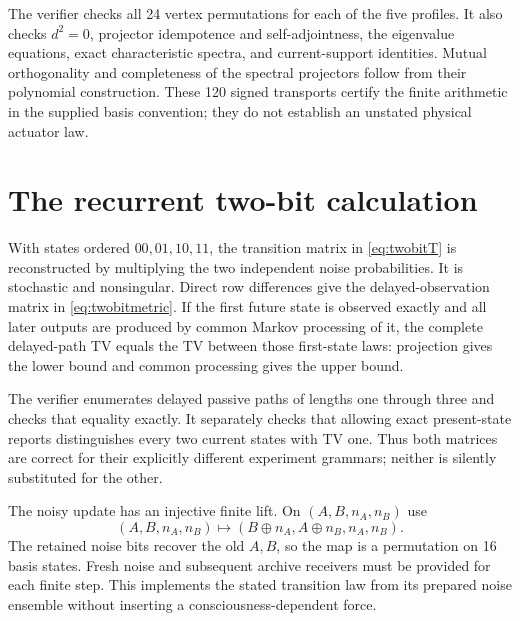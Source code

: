 The verifier checks all 24 vertex permutations for each of the five profiles. It also checks $d^2=0$, projector idempotence and self-adjointness, the eigenvalue equations, exact characteristic spectra, and current-support identities. Mutual orthogonality and completeness of the spectral projectors follow from their polynomial construction. These 120 signed transports certify the finite arithmetic in the supplied basis convention; they do not establish an unstated physical actuator law.

\section{The recurrent two-bit calculation}\label{section:matrices:the-recurrent-two-bit-calculation}
With states ordered $00,01,10,11$, the transition matrix in \cref{eq:twobitT} is reconstructed by multiplying the two independent noise probabilities. It is stochastic and nonsingular. Direct row differences give the delayed-observation matrix in \cref{eq:twobitmetric}. If the first future state is observed exactly and all later outputs are produced by common Markov processing of it, the complete delayed-path TV equals the TV between those first-state laws: projection gives the lower bound and common processing gives the upper bound.

The verifier enumerates delayed passive paths of lengths one through three and checks that equality exactly. It separately checks that allowing exact present-state reports distinguishes every two current states with TV one. Thus both matrices are correct for their explicitly different experiment grammars; neither is silently substituted for the other.

The noisy update has an injective finite lift. On $(A,B,n_A,n_B)$ use
\[
(A,B,n_A,n_B)\longmapsto
(B\oplus n_A,A\oplus n_B,n_A,n_B).
\]
The retained noise bits recover the old $A,B$, so the map is a permutation on 16 basis states. Fresh noise and subsequent archive receivers must be provided for each finite step. This implements the stated transition law from its prepared noise ensemble without inserting a consciousness-dependent force.

